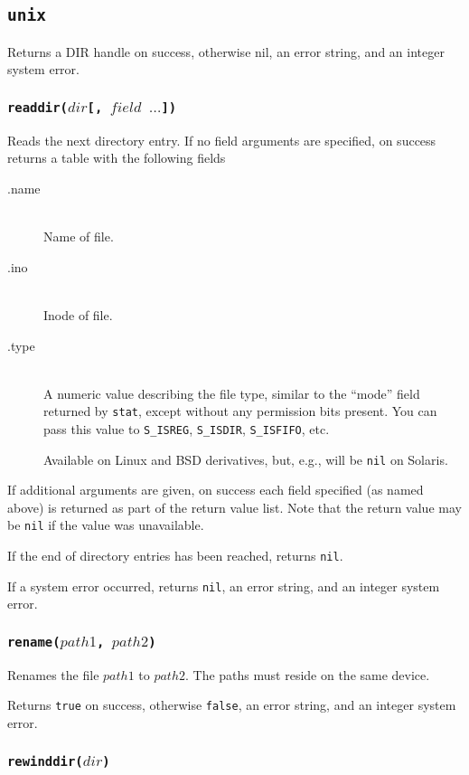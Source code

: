 \documentclass[11pt, oneside]{memoir}
\newcommand*{\true}[0]{\texttt{true}\xspace}
\newcommand*{\false}[0]{\texttt{false}\xspace}
\newcommand*{\nil}[0]{\texttt{nil}\xspace}
\newcommand*{\syscall}[1]{\texttt{#1}\xspace}
\newcommand*{\fn}[1]{\texttt{#1}\xspace}
\newcounter{toccols}
\newenvironment{Module}[1]{
	\subsection{\texttt{#1}}
	\addtocontents{toc}{
		\protect\begin{multicols}{\value{toccols}}
	}
}{
	\addtocontents{toc}{\protect\end{multicols}}
}
\begin{document}
\begin{Module}{unix}
Returns a DIR handle on success, otherwise nil, an error string, and an integer system error.

\subsubsection[\fn{readdir}]{\fn{readdir($dir$[, $field$ $\ldots$])}}

Reads the next directory entry. If no field arguments are specified, on success returns a table with the following fields

\begin{description}
\item[.name] \hfill \\
Name of file.
\item[.ino] \hfill \\
Inode of file.
\item[.type] \hfill \\
A numeric value describing the file type, similar to the ``mode'' field returned by \syscall{stat}, except without any permission bits present. You can pass this value to \fn{S\_ISREG}, \fn{S\_ISDIR}, \fn{S\_ISFIFO}, etc.

Available on Linux and BSD derivatives, but, e.g., will be \nil on Solaris.
\end{description}

If additional arguments are given, on success each field specified (as named above) is returned as part of the return value list. Note that the return value may be \nil if the value was unavailable.

If the end of directory entries has been reached, returns \nil.

If a system error occurred, returns \nil, an error string, and an integer system error.

\subsubsection[\fn{rename}]{\fn{rename($path1$, $path2$)}}

Renames the file $path1$ to $path2$. The paths must reside on the same device.

Returns \true on success, otherwise \false, an error string, and an integer system error.

\subsubsection[\fn{rewinddir}]{\fn{rewinddir($dir$)}}


\end{Module}
\end{document}
